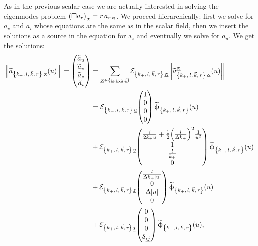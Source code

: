 As in the previous scalar case we are actually interested in solving
the eigenmodes problem $\qty(\square a_r)_\upalpha= r \,a_{r\, \upalpha}$.
We proceed hierarchically: first we solve for $a_v$ and $a_i$ whose equations are the same as in the scalar field, then we insert the solutions as a source in the equation for $a_z$ and eventually we solve for $a_u$.\footnotemark{}
We get the solutions:
\begin{equation}
  \begin{split}
    \norm{\tildea_{\kmkr\, \alpha}(u)}
    \,=
    \mqty(%
      \tildea_u
      \\
      \tildea_v
      \\
      \tildea_z
      \\
      \tildea_i
    )
    & =
    \sum\limits_{%
      \underline{\alpha}
      \in 
      \qty{ \underu, \underv, \underz,\underi }
    }
    \pol{\alpha}
    \norm{\tildea^{\underline{\alpha}}_{\kmkr\, \alpha}(u)}
    \\
    & =
    \pol{u}
    \mqty(
      1
      \\
      0
      \\
      0
      \\
      0
    )\,
    \tphi_{\kmkr}(u)
    \\
    & +
    \pol{v}
    \mqty(
      \frac{i}{2 k_+ u}
      +
      \frac{1}{2} \qty( \frac{l}{\Delta k_+} )^2 \frac{1}{u^2}
      \\
      1
      \\
      \frac{l}{k_+}
      \\
      0
    )\,
    \tphi_{\kmkr}(u)
    \\
    & +
    \pol{z}
    \mqty(
      \frac{l}{\Delta k_+ \abs{u}}
      \\
      0
      \\
      \Delta \abs{u}
      \\
      0
    )\,
    \tphi_{\kmkr}(u)
    \\
    & +
    \pol{j}
    \mqty(
      0
      \\
      0
      \\
      0
      \\
      \delta_{\underline{ij}}
    )\,
    \tphi_{\kmkr}(u),
    \label{eq:Orbifold_spin1_pol}
  \end{split}
\end{equation}

